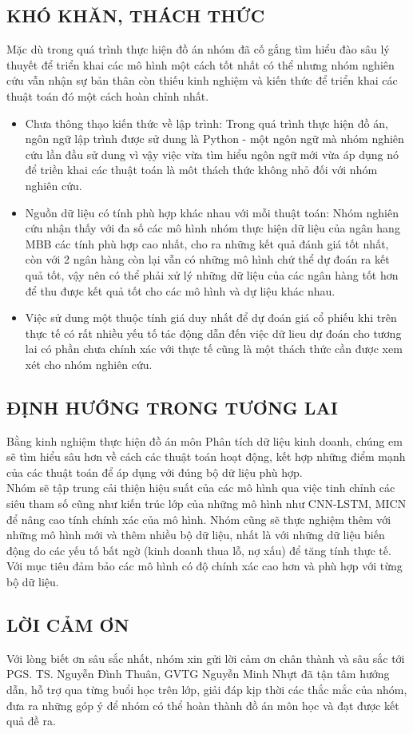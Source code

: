 \documentclass[conference]{IEEEtran}
\begin{document}
\subsection{KHÓ KHĂN, THÁCH THỨC}
Mặc dù trong quá trình thực hiện đồ án nhóm đã cố gắng tìm hiểu đào sâu lý thuyết để triển khai các mô hình một cách tốt nhất có thể nhưng nhóm nghiên cứu vẫn nhận sự bản thân còn thiếu kinh nghiệm và kiến thức để triển khai các thuật toán đó một cách hoàn chỉnh nhất. 
\begin{itemize}
    \item Chưa thông thạo kiến thức về lập trình: Trong quá trình thực hiện đồ án, ngôn ngữ lập trình được sử dung là Python - một ngôn ngữ mà nhóm nghiên cứu lần đầu sử dung vì vậy việc vừa tìm hiểu ngôn ngữ mới vừa áp dụng nó để triền khai các thuật toán là môt thách thức không nhỏ đối với nhóm nghiên cứu.
    \item Nguồn dữ liệu có tính phù hợp khác nhau với mỗi thuật toán: Nhóm nghiên cứu nhận thấy với đa số các mô hình nhóm thực hiện dữ liệu của ngân hang MBB các tính phù hợp cao nhất, cho ra những kết quả đánh giá tốt nhất, còn với 2 ngân hàng còn lại vẫn có những mô hình chứ thể dự đoán ra kết quả tốt, vậy nên có thể phải xử lý những dữ liệu của các ngân hàng tốt hơn để thu được kết quả tốt cho các mô hình và dự liệu khác nhau.
    \item Việc sử dung một thuộc tính giá duy nhất để dự đoán giá cổ phiếu khi trên thực tế có rất nhiều yếu tố tác động dẫn đến việc dữ lieu dự đoán cho tương lai có phần chưa chính xác với thực tế cũng là một thách thức cần được xem xét cho nhóm nghiên cứu. 
\end{itemize}

\subsection{ĐỊNH HƯỚNG TRONG TƯƠNG LAI}
Bằng kinh nghiệm thực hiện đồ án môn Phân tích dữ liệu kinh doanh, chúng em sẽ tìm hiểu sâu hơn về cách các thuật toán hoạt động, kết hợp những điểm mạnh của các thuật toán để áp dụng với đúng bộ dữ liệu phù hợp.\\
Nhóm sẽ tập trung cải thiện hiệu suất của các mô hình qua việc tinh chỉnh các siêu tham số cũng như kiến trúc lớp của những mô hình như CNN-LSTM, MICN để nâng cao tính chính xác của mô hình.
Nhóm cũng sẽ thực nghiệm thêm với những mô hình mới và thêm nhiều bộ dữ liệu, nhất là với những dữ liệu biến động do các yếu tố bất ngờ (kinh doanh thua lỗ, nợ xấu) để tăng tính thực tế.\\
Với mục tiêu đảm bảo các mô hình có độ chính xác cao hơn và phù hợp với từng bộ dữ liệu.

\subsection{LỜI CẢM ƠN}
Với lòng biết ơn sâu sắc nhất, nhóm xin gửi lời cảm ơn chân thành và sâu sắc tới PGS. TS. Nguyễn Đình Thuân, GVTG Nguyễn Minh Nhựt đã tận tâm hướng dẫn, hỗ trợ qua từng buổi học trên lớp, giải đáp kịp thời các thắc mắc của nhóm, đưa ra những góp ý để nhóm có thể hoàn thành đồ án môn học và đạt được kết quả đề ra.

\printbibliography
\end{document}
